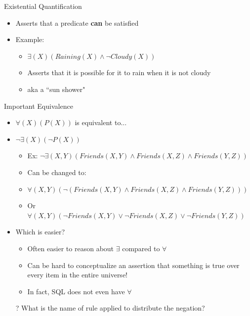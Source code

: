 \documentclass[aspectratio=169]{beamer}
\begin{document}
\begin{frame}{Existential Quantification}

\begin{itemize}
\item Asserts that a predicate \textbf{can} be satisfied
\item Example:
	\begin{itemize}
	\item $\exists(X)(Raining(X) \wedge \neg Cloudy(X))$
	\item Asserts that it is possible for it to rain when it is not cloudy
	\item aka a ``sun shower"
	\end{itemize}
\end{itemize}
\end{frame}


\begin{frame}{Important Equivalence}

\begin{itemize}
\item $\forall(X)(P(X))$ is equivalent to...
\item $\neg \exists(X)(\neg P(X))$
	\begin{itemize}
	\item Ex: $\neg \exists(X,Y)(Friends(X,Y) \wedge Friends(X,Z) \wedge Friends(Y, Z))$
	\item Can be changed to:
	\item $\forall(X,Y)(\neg(Friends(X,Y) \wedge Friends(X,Z) \wedge Friends(Y, Z)))$
	\item Or $\forall(X,Y)( \neg Friends(X,Y) \vee \neg Friends(X,Z) \vee \neg Friends(Y, Z))$
	\end{itemize}
\item Which is easier?
	\begin{itemize}
	\item Often easier to reason about $\exists$ compared to $\forall$
	\item Can be hard to conceptualize an assertion that something is true over every
	item in the entire universe!
	\item In fact, SQL does not even have $\forall$
	\end{itemize}
\item[?] What is the name of rule applied to distribute the negation? %
\end{itemize}
\end{frame}
	
\end{document}

